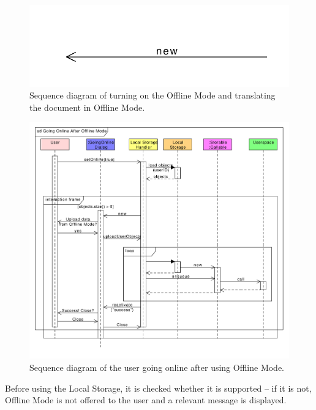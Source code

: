 \begin{figure}[h]
\begin{center}
\includegraphics[scale=0.55]{figures/offline_mode_1.pdf}
\end{center}
\caption{Sequence diagram of turning on the Offline Mode and translating the document in Offline Mode.}\label{gui:sd:offline_mode_1}
\end{figure}

\begin{figure}[h]
\begin{center}
\includegraphics[scale=0.55]{figures/offline_mode_2.pdf}
\end{center}
\caption{Sequence diagram of the user going online after using Offline Mode.}\label{gui:sd:offline_mode_2}
\end{figure}

Before using the Local Storage, it is checked whether it is supported -- if it is not, Offline Mode is not offered to the user and a relevant message is displayed.

